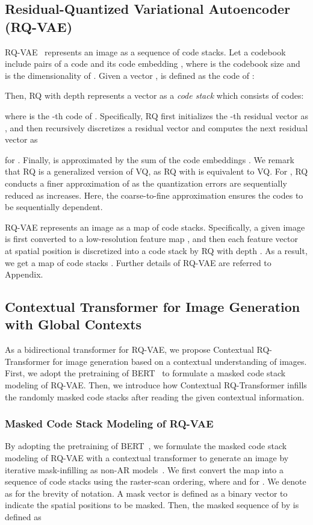 \documentclass{article}
\begin{document}
\subsection{Residual-Quantized Variational Autoencoder (RQ-VAE)}
RQ-VAE~\cite{RQVAE} represents an image as a sequence of code stacks.
Let a codebook  include pairs of a code  and its code embedding , where  is the codebook size and  is the dimensionality of .
Given a vector ,  is defined as the code of :

Then, RQ with depth  represents a vector as a \emph{code stack} which consists of  codes:

where  is the -th code of .
Specifically, RQ first initializes the -th residual vector as , and then recursively discretizes a residual vector  and computes the next residual vector  as

for .
Finally,  is approximated by the sum of the  code embeddings .
We remark that RQ is a generalized version of VQ, as RQ with  is equivalent to VQ.
For , RQ conducts a finer approximation of  as the quantization errors are sequentially reduced as  increases.
Here, the coarse-to-fine approximation ensures the  codes to be sequentially dependent. 

RQ-VAE represents an image as a map of code stacks.
Specifically, a given image  is first converted to a low-resolution feature map , and then each feature vector  at spatial position  is discretized into a code stack by RQ with depth . As a result, we get a map of code stacks .
Further details of RQ-VAE are referred to Appendix.



\subsection{Contextual Transformer for Image Generation with Global Contexts}
As a bidirectional transformer for RQ-VAE, we propose Contextual RQ-Transformer for image generation based on a contextual understanding of images.
First, we adopt the pretraining of BERT~\cite{BERT} to formulate a masked code stack modeling of RQ-VAE.
Then, we introduce how Contextual RQ-Transformer infills the randomly masked code stacks after reading the given contextual information.


\subsubsection{Masked Code Stack Modeling of RQ-VAE}
By adopting the pretraining of BERT~\cite{BERT}, we formulate the masked code stack modeling of RQ-VAE with a contextual transformer to generate an image by iterative mask-infilling as non-AR models~\cite{mask-predict}.
We first convert the map  into a sequence of code stacks  using the raster-scan ordering, where  and  for .
We denote  as  for the brevity of notation.
A mask vector  is defined as a binary vector  to indicate the spatial positions to be masked.
Then, the masked sequence  of  by  is defined as
\end{document}
